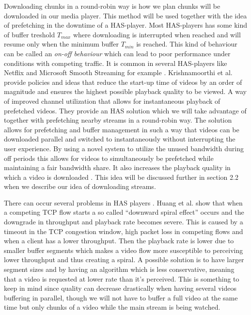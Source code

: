 Downloading chunks in a round-robin way is how we plan chunks will be downloaded in our media player. This method will be used together with the idea of prefetching in the downtime of a HAS-player. Most HAS-players has some kind of buffer treshold $T_{max}$ where downloading is interrupted when reached and will resume only when the minimum buffer $T_{min}$ is reached. This kind of behaviour can be called an \textit{on-off behaviour} which can lead to poor performance under conditions with competing traffic. It is common in several HAS-players like Netflix and Microsoft Smooth Streaming for example \cite{bandawarePrefetch}. Krishnamoorthi et al. \cite{bandawarePrefetch} provide policies and ideas that reduce the start-up time of videos by an order of magnitude and ensures the highest possible playback quality to be viewed. A way of improved channel utilization that allows for instantaneous playback of prefetched videos. They provide an HAS solution which we will take advantage of together with prefetching nearby streams in a round-robin way. The solution allows for prefetching and buffer management in such a way that videos can be downloaded parallel and switched to instantaneously without interrupting the user experience. By using a novel system to utilize the unused bandwidth during off periods this allows for videos to simultaneously be prefetched while maintaining a fair bandwidth share. It also increases the playback quality in which a video is downloaded \cite{bandawarePrefetch}. This idea will be discussed further in section 2.2 when we describe our idea of downloading streams.

There can occur several problems in HAS players \cite{qualbranch}. Huang et al. \cite{streamrate} show that when a competing TCP flow starts a so called “downward spiral effect” occurs and the downgrade in throughput and playback rate becomes severe. This is caused by a timeout in the TCP congestion window, high packet loss in competing flows and when a client has a lower throughput. Then the playback rate is lower due to smaller buffer segments which makes a video flow more susceptible to perceiving lower throughput and thus creating a spiral. A possible solution is to have larger segment sizes and by having an algorithm which is less conservative, meaning that a video is requested at lower rate than it's perceived. This is something to keep in mind since quality can decrease drastically when having several videos buffering in parallel, though we will not have to buffer a full video at the same time but only chunks of a video while the main stream is being watched.


